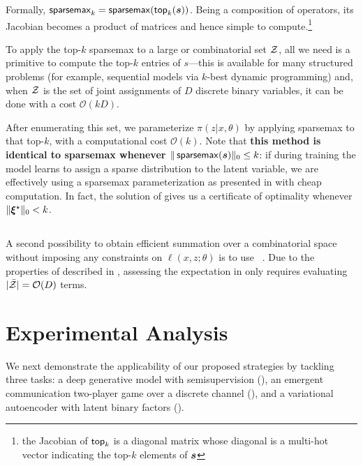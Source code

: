 Formally, $\operatorname{\mathsf{sparsemax}_\text{$k$}} = \operatorname*{\mathsf{sparsemax}}(\operatorname{\mathsf{top}_\text{$k$}}(\bm{s}))$. Being a composition
of operators, its Jacobian becomes a product of matrices and hence
simple to compute.\footnote{the Jacobian of $\operatorname{\mathsf{top}_\text{$k$}}$ is a diagonal matrix whose
    diagonal is a multi-hot vector indicating the top-$k$ elements of
    $\bm{s}$}

To apply the top-$k$ sparsemax to a large or combinatorial set $\mathcal{Z}$,
all we need is a primitive to compute the top-$k$ entries of
$s$---this is available for many structured problems (for example,
sequential models via $k$-best dynamic programming) and, when $\mathcal{Z}$
is the set of joint assignments of $D$ discrete binary variables, it
can be done with a cost $\mathcal{O}(kD)$.

After enumerating this set, we parameterize $\pi(z|x,\theta)$ by
applying sparsemax to that top-$k$, with a
computational cost $\mathcal{O}(k)$. Note that {\bf this method is
        identical to sparsemax whenever $\|\operatorname*{\mathsf{sparsemax}}(\bm{s})\|_0 \le k$}: if
during training the model learns to assign a sparse distribution to
the latent variable, we are effectively using a sparsemax
parameterization as presented in  with cheap
computation. In fact, the solution of 
gives us a certificate of optimality whenever $\|\bm{\xi}^\star\|_0 < k$.

\subsection{\label{sec:smap}\smap}

A second possibility to obtain efficient summation over a
combinatorial space without imposing any constraints on $\ell(x, z;
    \theta)$ is to use \smap~\citep{niculae2018sparsemap, sparsemapcg}.
Due to the properties of \smap described in ,
assessing the expectation in  only requires evaluating
$|\bar{\mathcal{Z}}| = \mathcal{O}(D)$ terms.

\section{\label{sec:applications}Experimental Analysis}

We next demonstrate the applicability of our proposed strategies by
tackling three tasks: a deep generative model with semisupervision
(), an emergent communication two-player game over a
discrete channel (), and a variational autoencoder with
latent binary factors ().

